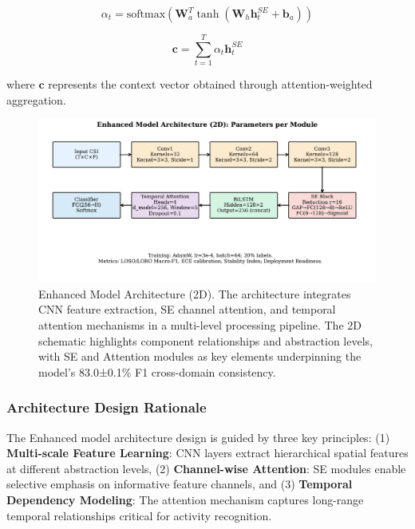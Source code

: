 \documentclass[journal]{IEEEtran}
\begin{document}
\begin{equation}
\alpha_t = \text{softmax}(\mathbf{W}_a^T \tanh(\mathbf{W}_h \mathbf{h}_t^{SE} + \mathbf{b}_a))
\end{equation}

\begin{equation}
\mathbf{c} = \sum_{t=1}^{T} \alpha_t \mathbf{h}_t^{SE}
\end{equation}

where $\mathbf{c}$ represents the context vector obtained through attention-weighted aggregation.

\begin{figure}[ht]
\centering
\includegraphics[width=\columnwidth]{figures/fig3_enhanced_model_dataflow.pdf}%
\caption{Enhanced Model Architecture (2D). The architecture integrates CNN feature extraction, SE channel attention, and temporal attention mechanisms in a multi-level processing pipeline. The 2D schematic highlights component relationships and abstraction levels, with SE and Attention modules as key elements underpinning the model's 83.0±0.1\% F1 cross-domain consistency.}
\label{fig:enhanced_3d_arch}
\end{figure}

\subsubsection{Architecture Design Rationale}

The Enhanced model architecture design is guided by three key principles: (1) \textbf{Multi-scale Feature Learning}: CNN layers extract hierarchical spatial features at different abstraction levels, (2) \textbf{Channel-wise Attention}: SE modules enable selective emphasis on informative feature channels, and (3) \textbf{Temporal Dependency Modeling}: The attention mechanism captures long-range temporal relationships critical for activity recognition.
\end{document}
